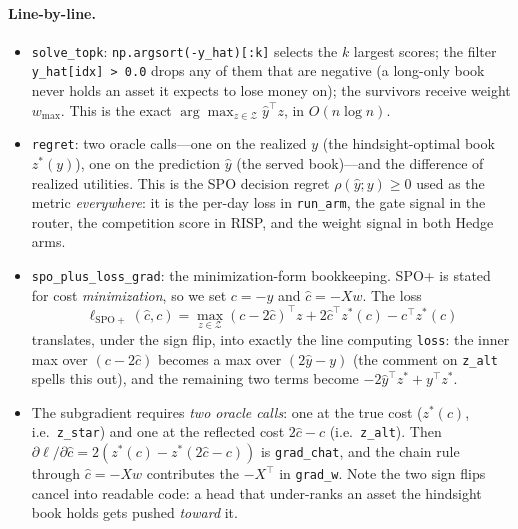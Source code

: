 \paragraph{Line-by-line.}
\begin{itemize}
  \item \texttt{solve\_topk}: \texttt{np.argsort(-y\_hat)[:k]} selects the
        $k$ largest scores; the filter \texttt{y\_hat[idx] > 0.0} drops any
        of them that are negative (a long-only book never holds an asset it
        expects to lose money on); the survivors receive weight
        $w_{\max}$. This is the exact $\arg\max_{z \in \mathcal{Z}}
        \hat{y}^\top z$, in $O(n \log n)$.
  \item \texttt{regret}: two oracle calls---one on the realized $y$ (the
        hindsight-optimal book $z^*(y)$), one on the prediction $\hat y$ (the
        served book)---and the difference of realized utilities. This is the
        SPO decision regret $\rho(\hat y; y) \ge 0$ used as the metric
        \emph{everywhere}: it is the per-day loss in \texttt{run\_arm}, the
        gate signal in the router, the competition score in RISP, and
        the weight signal in both Hedge arms.
  \item \texttt{spo\_plus\_loss\_grad}: the minimization-form bookkeeping.
        SPO+ is stated for cost \emph{minimization}, so we set $c = -y$ and
        $\hat c = -Xw$. The loss
        \[
          \ell_{\mathrm{SPO+}}(\hat c, c)
          = \max_{z \in \mathcal{Z}} (c - 2\hat c)^\top z
            + 2 \hat c^\top z^*(c) - c^\top z^*(c)
        \]
        translates, under the sign flip, into exactly the line computing
        \texttt{loss}: the inner max over $(c - 2\hat c)$ becomes a max over
        $(2\hat y - y)$ (the comment on \texttt{z\_alt} spells this out), and
        the remaining two terms become $-2\hat y^\top z^* + y^\top z^*$.
  \item The subgradient requires \emph{two oracle calls}: one at the true
        cost ($z^*(c)$, i.e.\ \texttt{z\_star}) and one at the reflected
        cost $2\hat c - c$ (i.e.\ \texttt{z\_alt}). Then
        $\partial \ell / \partial \hat c = 2(z^*(c) - z^*(2\hat c - c))$
        is \texttt{grad\_chat}, and the chain rule through
        $\hat c = -Xw$ contributes the $-X^\top$ in \texttt{grad\_w}. Note
        the two sign flips cancel into readable code: a head that
        under-ranks an asset the hindsight book holds gets pushed
        \emph{toward} it.
\end{itemize}

